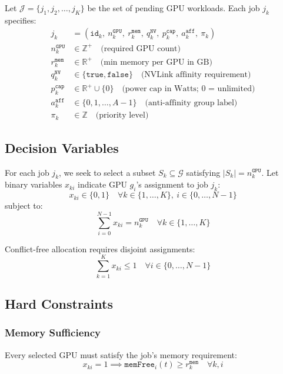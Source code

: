 \documentclass[11pt, twoside]{article}
\begin{document}
Let $\mathcal{J} = \{j_1, j_2, \ldots, j_K\}$ be the set of pending GPU workloads. Each job $j_k$ specifies:
\begin{align}
j_k &= (\texttt{id}_k,\ n_k^{\texttt{GPU}},\ r_k^{\texttt{mem}},\ q_k^{\texttt{NV}},\ p_k^{\texttt{cap}},\ a_k^{\texttt{aff}},\ \pi_k) \\
n_k^{\texttt{GPU}} &\in \mathbb{Z}^+ \quad \text{(required GPU count)} \\
r_k^{\texttt{mem}} &\in \mathbb{R}^+ \quad \text{(min memory per GPU in GB)} \\
q_k^{\texttt{NV}} &\in \{\texttt{true}, \texttt{false}\} \quad \text{(NVLink affinity requirement)} \\
p_k^{\texttt{cap}} &\in \mathbb{R}^+ \cup \{0\} \quad \text{(power cap in Watts; 0 = unlimited)} \\
a_k^{\texttt{aff}} &\in \{0, 1, \ldots, A-1\} \quad \text{(anti-affinity group label)} \\
\pi_k &\in \mathbb{Z} \quad \text{(priority level)}
\end{align}

\subsection{Decision Variables}

For each job $j_k$, we seek to select a subset $S_k \subseteq \mathcal{G}$ satisfying $|S_k| = n_k^{\texttt{GPU}}$. Let binary variables $x_{ki}$ indicate GPU $g_i$'s assignment to job $j_k$:
\begin{equation}
x_{ki} \in \{0, 1\} \quad \forall k \in \{1,\ldots,K\},\ i \in \{0,\ldots,N-1\}
\label{eq:variables_binary}
\end{equation}
subject to:
\begin{equation}
\sum_{i=0}^{N-1} x_{ki} = n_k^{\texttt{GPU}} \quad \forall k \in \{1,\ldots,K\}
\label{eq:cardinality_constraint}
\end{equation}

Conflict-free allocation requires disjoint assignments:
\begin{equation}
\sum_{k=1}^{K} x_{ki} \leq 1 \quad \forall i \in \{0,\ldots,N-1\}
\label{eq:disjoint_allocation}
\end{equation}

\subsection{Hard Constraints}

\subsubsection{Memory Sufficiency}
Every selected GPU must satisfy the job's memory requirement:
\begin{equation}
x_{ki} = 1 \implies \texttt{memFree}_i(t) \geq r_k^{\texttt{mem}} \quad \forall k,i
\label{eq:memory_constraint}
\end{equation}
\end{document}
